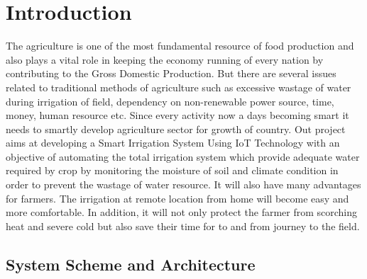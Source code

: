 \section{Introduction}
The agriculture is one of the most fundamental resource of food production and also plays a vital role in keeping the economy running of every nation by contributing to the Gross Domestic Production. But there are several issues related to traditional methods of agriculture such as excessive wastage of water during irrigation of field, dependency on non-renewable power source, time, money, human resource etc. Since every activity now a days becoming smart it needs to smartly develop agriculture sector for growth of country. Out project aims at developing a Smart Irrigation System Using IoT Technology with an objective of automating the total irrigation system which provide adequate water required by crop by monitoring the moisture of soil and climate condition in order to prevent the wastage of water resource. It will also have many advantages for farmers. The irrigation at remote location from home will become easy and more comfortable. In addition, it will not only protect the farmer from scorching heat and severe cold but also save their time for to and from journey to the field.



\subsection{System Scheme and Architecture}
